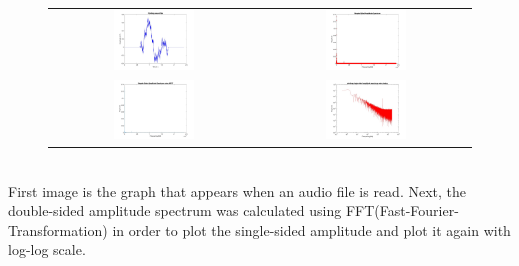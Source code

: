 \documentclass[
	a4paper,
	11pt,
]{article}
\begin{document}
\\

\begin{figure}
  \centering 
    \begin{tabular}{cc}
    \includegraphics[width=0.4\textwidth]{A1/image1.jpg}&
    \includegraphics[width=0.4\textwidth ]{A1/image2.jpg}\\
    \includegraphics[width=0.4\textwidth ]{A1/image3.jpg}&
    \includegraphics[width=0.4\textwidth ]{A1/image4.jpg}\\
     \end{tabular}
\end{figure}
\\

First image is the graph that appears when an audio file is read. Next, the double-sided amplitude spectrum was calculated using FFT(Fast-Fourier-Transformation) in order to plot the single-sided amplitude and plot it again with log-log scale.
\end{document}
